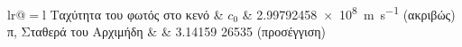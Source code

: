 \documentclass[
	12pt, %
	english, %
	onehalfspacing, %
	liststotoc, %
	toctotoc, %
	parskip, %
	headsepline, %
]{MastersDoctoralThesis} %
\begin{document}







\renewcommand*\contentsname{Περιεχόμενα}
\renewcommand\abstractname{Περίληψη}
\renewcommand*\listfigurename{Λίστα εικόνων}
\renewcommand*\listtablename{Λίστα πινάκων}
\renewcommand*\listalgorithmname{Λίστα Αλγορίθμων}
\renewcommand*\chaptername{Κεφάλαιο}
\renewcommand*\tablename{Πίνακας}
\renewcommand*\figurename{Εικόνα}
\renewcommand*\lstlistingname{Παράθεση}

\tableofcontents %
\listoffigures %
\listoftables %
\listofalgorithms %


\begin{constants}{lr@{${}={}$}l} %
	Ταχύτητα του φωτός στο κενό & $c_{0}$ & \SI{2.99792458e8}{\meter\per\second} (ακριβώς)\\
	π, Σταθερά του Αρχιμήδη & \pi & 3.14159 26535 (προσέγγιση)
\end{constants}
\end{document}
